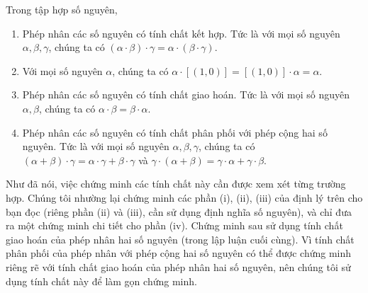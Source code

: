 \begin{theorem}\label{theorem:property-of-integers-multiplication}
	Trong tập hợp số nguyên,
	\begin{enumerate}[label={(\roman*)}]
		\item Phép nhân các số nguyên có tính chất kết hợp. Tức là với mọi số nguyên $\alpha, \beta, \gamma$, chúng ta có $(\alpha\cdot\beta)\cdot\gamma = \alpha\cdot(\beta\cdot\gamma)$.
		\item Với mọi số nguyên $\alpha$, chúng ta có $\alpha\cdot [(1, 0)] = [(1, 0)]\cdot\alpha = \alpha$.
		\item Phép nhân các số nguyên có tính chất giao hoán. Tức là với mọi số nguyên $\alpha, \beta$, chúng ta có $\alpha\cdot\beta = \beta\cdot\alpha$.
		\item Phép nhân các số nguyên có tính chất phân phối với phép cộng hai số nguyên. Tức là với mọi số nguyên $\alpha, \beta, \gamma$, chúng ta có $(\alpha + \beta)\cdot\gamma = \alpha\cdot\gamma + \beta\cdot\gamma$ và $\gamma\cdot(\alpha + \beta) = \gamma\cdot\alpha + \gamma\cdot\beta$.
	\end{enumerate}
\end{theorem}

Như đã nói, việc chứng minh các tính chất này cần được xem xét từng trường hợp. Chúng tôi nhường lại chứng minh các phần (i), (ii), (iii) của định lý trên cho bạn đọc (riêng phần (ii) và (iii), cần sử dụng định nghĩa số nguyên), và chỉ đưa ra một chứng minh chi tiết cho phần (iv). Chứng minh sau sử dụng tính chất giao hoán của phép nhân hai số nguyên (trong lập luận cuối cùng). Vì tính chất phân phối của phép nhân với phép cộng hai số nguyên có thể được chứng minh riêng rẽ với tính chất giao hoán của phép nhân hai số nguyên, nên chúng tôi sử dụng tính chất này để làm gọn chứng minh.

